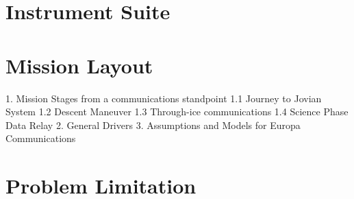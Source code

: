 \section{Instrument Suite}

\section{Mission Layout}

%



1. Mission Stages from a communications standpoint
    1.1 Journey to Jovian System
    1.2 Descent Maneuver
    1.3 Through-ice communications
    1.4 Science Phase Data Relay
2. General Drivers
3. Assumptions and Models for Europa Communications

\section{Problem Limitation}
